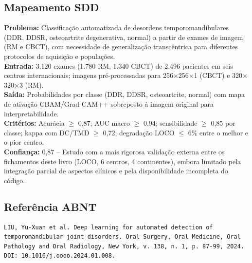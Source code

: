 \subsection{Mapeamento SDD}
\textbf{Problema:} Classificação automatizada de desordens
temporomandibulares (DDR, DDSR, osteoartrite degenerativa, normal) a
partir de exames de imagem (RM e CBCT), com necessidade de
generalização transcêntrica para diferentes protocolos de aquisição e
populações. \\
\textbf{Entrada:} 3.120 exames (1.780 RM, 1.340 CBCT) de 2.496 pacientes
em seis centros internacionais; imagens pré-processadas para
256$\times$256$\times$1 (CBCT) e 320$\times$320$\times$3 (RM). \\
\textbf{Saída:} Probabilidades por classe (DDR, DDSR, osteoartrite,
normal) com mapa de ativação CBAM/Grad-CAM++ sobreposto à imagem
original para interpretabilidade. \\
\textbf{Critérios:} Acurácia $\geq$ 0,87; AUC macro $\geq$ 0,94;
sensibilidade $\geq$ 0,85 por classe; kappa com DC/TMD $\geq$ 0,72;
degradação LOCO $\leq$ 6\% entre o melhor e o pior centro. \\
\textbf{Confiança:} 0,87 -- Estudo com a mais rigorosa validação externa
entre os fichamentos deste livro (LOCO, 6 centros, 4 continentes),
embora limitado pela integração parcial de aspectos clínicos e pela
disponibilidade incompleta do código.

\subsection{Referência ABNT}
\begin{verbatim}
LIU, Yu-Xuan et al. Deep learning for automated detection of
temporomandibular joint disorders. Oral Surgery, Oral Medicine, Oral
Pathology and Oral Radiology, New York, v. 138, n. 1, p. 87-99, 2024.
DOI: 10.1016/j.oooo.2024.01.008.
\end{verbatim}
\endinput
